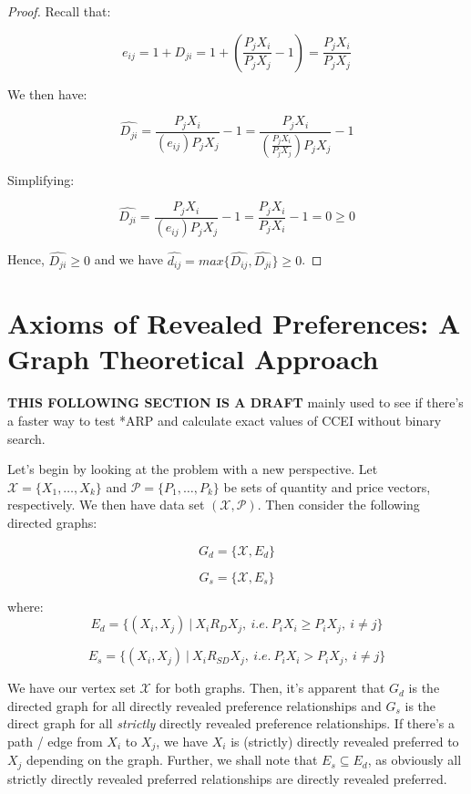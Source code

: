 \documentclass{article} %
\begin{document}
\begin{proof}
Recall that:

$$e_{ij}=1+D_{ji}=1+ \left (\frac{P_jX_i}{P_jX_j}-1 \right )=\frac{P_jX_i}{P_jX_j}$$

We then have:

$$\hat{D_{ji}}=\frac{P_jX_i}{(e_{ij})P_jX_j}-1=\frac{P_jX_i}{(\frac{P_jX_i}{P_jX_j})P_jX_j}-1$$

Simplifying:

$$\hat{D_{ji}}=\frac{P_jX_i}{(e_{ij})P_jX_j}-1=\frac{P_jX_i}{P_jX_i}-1=0\geq0$$

Hence, $\hat{D_{ji}}\geq0$ and we have $\hat{d_{ij}}=max\{\hat{D_{ij}},\hat{D_{ji}}\}\geq0$.

\end{proof}

\newpage

\section{Axioms of Revealed Preferences: A Graph Theoretical Approach}

\textbf{THIS FOLLOWING SECTION IS A DRAFT} mainly used to see if there's a faster way to test *ARP and calculate exact values of CCEI without binary search.


Let's begin by looking at the problem with a new perspective. Let $\mathcal{X}=\{X_1,\ldots,X_k\}$ and $\mathcal{P}=\{P_1,\ldots,P_k\}$ be sets of quantity and price vectors, respectively. We then have data set $(\mathcal{X},\mathcal{P})$. Then consider the following directed graphs:


\begin{minipage}{.5\linewidth}
$$G_d=\{\mathcal{X},E_d\}$$
\end{minipage}%
\begin{minipage}{.5\linewidth}
$$G_s=\{\mathcal{X},E_s\}$$
\end{minipage}


where:
$$E_d=\{(X_i,X_j)\ |\ X_i R_D X_j,\ i.e.\ P_iX_i\geq P_iX_j,\ i\not=j\}$$

$$E_s=\{(X_i,X_j)\ |\ X_i R_{SD} X_j,\ i.e.\ P_iX_i> P_iX_j,\ i\not=j\}$$

We have our vertex set $\mathcal{X}$ for both graphs. Then, it's apparent that $G_d$ is the directed graph for all directly revealed preference relationships and $G_s$ is the direct graph for all \textit{strictly} directly revealed preference relationships. If there's a path / edge from $X_i$ to $X_j$, we have $X_i$ is (strictly) directly revealed preferred to $X_j$ depending on the graph. Further, we shall note that $E_s\subseteq E_d$, as obviously all strictly directly revealed preferred relationships are directly revealed preferred.
\end{document}
